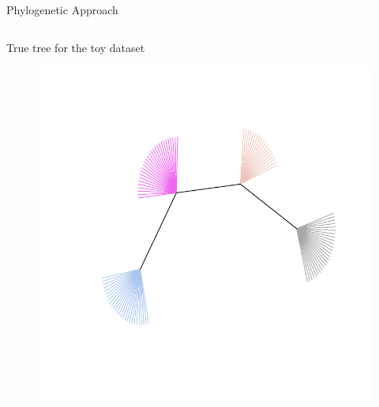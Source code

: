 \documentclass{beamer}
\begin{document}
\begin{frame}{Phylogenetic Approach}

\vspace{0.5cm}
\begin{columns}

\begin{column}{0.5\textwidth}
  \begin{center}
  \small True tree for the toy dataset
  \vspace{-0.5cm}
  \begin{figure}
  \includegraphics[width=1.05\textwidth]{./graph/seq-2_nj}
  \end{figure}
  \end{center}
\end{column}

\hspace{-0.5cm}


\end{columns}
\end{frame}
\end{document}
